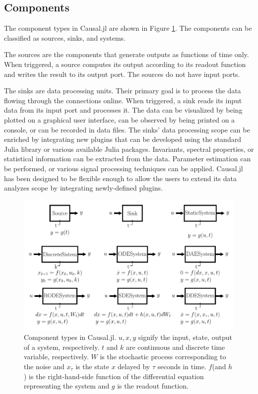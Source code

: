 \subsection{Components}
The component types in Causal.jl are shown in Figure \ref{fig: component types}. The components can be classified as sources, sinks, and systems.

The sources are the components that generate outputs as functions of time only. When triggered, a source computes its output according to its readout function and writes the result to its output port. The sources do not have input ports.

The sinks are data processing units. Their primary goal is to process the data flowing through the connections online. When triggered, a sink reads its input data from its input port and processes it. The data can be visualized by being plotted on a graphical user interface, can be observed by being printed on a console, or can be recorded in data files. The sinks' data processing scope can be enriched by integrating new plugins that can be developed using the standard Julia library or various available Julia packages. Invariants, spectral properties, or statistical information can be extracted from the data. Parameter estimation can be performed, or various signal processing techniques can be applied. Causal.jl has been designed to be flexible enough to allow the users to extend its data analyzes scope by integrating newly-defined plugins.

\begin{figure}
    \centering
    \includegraphics[width=\linewidth]{figures/ComponentsCompressed/components_compresses.pdf}
    \caption{Component types in Causal.jl. $u, x, y$ signify the input, state, output of a system, respectively. $t$ and $k$ are continuous and discrete time variable, respectively. $W$ is the stochastic process corresponding to the noise and $x_\tau$ is the state $x$ delayed by $\tau$ seconds in time. $f$(and $h$) is the right-hand-side function of the differential equation representing the system and $g$ is the readout function.}
    \label{fig: component types}
\end{figure}

